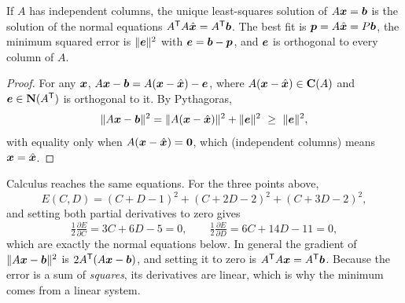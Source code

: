 \begin{theorem}[Least squares = projection]\label{thm:u18-ls}
If $A$ has independent columns, the unique least-squares solution of $A\boldsymbol{x}=\boldsymbol{b}$ is the
solution of the normal equations $A^{\mathsf{T}} A\hat{\boldsymbol{x}}=A^{\mathsf{T}}\boldsymbol{b}$. The best fit is
$\boldsymbol{p}=A\hat{\boldsymbol{x}}=P\boldsymbol{b}$, the minimum squared error is $\|\boldsymbol{e}\|^2$ with
$\boldsymbol{e}=\boldsymbol{b}-\boldsymbol{p}$, and $\boldsymbol{e}$ is orthogonal to every column of $A$.
\end{theorem}

\begin{proof}
For any $\boldsymbol{x}$,
$A\boldsymbol{x}-\boldsymbol{b}=A(\boldsymbol{x}-\hat{\boldsymbol{x}})-\boldsymbol{e}$, where $A(\boldsymbol{x}-\hat{\boldsymbol{x}})\in\mathbf{C}(A)$ and
$\boldsymbol{e}\in\mathbf{N}(A^{\mathsf{T}})$ is orthogonal to it. By Pythagoras,
\[
  \|A\vb{x}-\vb{b}\|^2=\|A(\vb{x}-\hat{\vb{x}})\|^2+\|\vb{e}\|^2\ \ge\ \|\vb{e}\|^2 ,
\]
with equality only when $A(\boldsymbol{x}-\hat{\boldsymbol{x}})=\boldsymbol{0}$, which (independent columns) means
$\boldsymbol{x}=\hat{\boldsymbol{x}}$.
\end{proof}

Calculus reaches the same equations. For the three points above,
\[
  E(C,D)=(C+D-1)^2+(C+2D-2)^2+(C+3D-2)^2 ,
\]
and setting both partial derivatives to zero gives
\[
  \tfrac12\tfrac{\partial E}{\partial C}=3C+6D-5=0,\qquad
  \tfrac12\tfrac{\partial E}{\partial D}=6C+14D-11=0,
\]
which are exactly the normal equations below. In general the gradient of $\|A\boldsymbol{x}-\boldsymbol{b}\|^2$
is $2A^{\mathsf{T}}(A\boldsymbol{x}-\boldsymbol{b})$, and setting it to zero is $A^{\mathsf{T}} A\boldsymbol{x}=A^{\mathsf{T}}\boldsymbol{b}$. Because the
error is a sum of \emph{squares}, its derivatives are linear, which is why the minimum comes
from a linear system.

